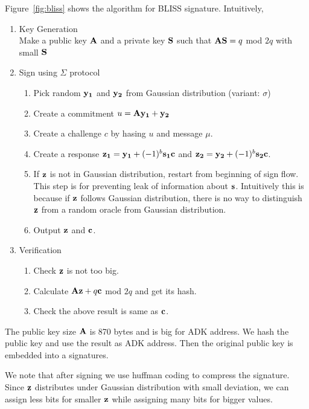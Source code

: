 \documentclass[a4paper,10pt,twocolumn]{article}
\begin{document}
 Figure~\ref{fig:bliss} shows the algorithm for BLISS signature. Intuitively,
 \begin{enumerate}
	\setlength\itemsep{0em}
\item Key Generation \\
Make a public key \( {\bf A} \) and a private key \( {\bf S} \) such that
\( {\bf A}{\bf S}=q \) mod \( 2q \)  with small \( {\bf S} \) 
\item Sign using \( \Sigma \) protocol
\begin{enumerate}
	\setlength\itemsep{0em}
	\item Pick random \( {\bf y_1} \) and \( {\bf y_2} \) from Gaussian distribution (variant: \( \sigma \))
\item Create a commitment  \( u = {\bf A}{\bf y_1} + {\bf y_2} \)
\item Create a challenge \( c \) by hasing \( u \) and message \( \mu \).
\item Create a response  \({\bf z_1} = {\bf y_1} + (-1)^{b}{\bf s_1}{\bf c}\) and  \({\bf z_2}= {\bf y_2} + (-1)^{b}{\bf s_2}{\bf c}\).
\item If \( {\bf z} \) is not in Gaussian distribution, restart from beginning of sign flow. This step is for preventing
leak of information about \( {\bf s} \). Intuitively this is because if \( {\bf z} \) follows Gaussian distribution, there is no way to
distinguish \( {\bf z} \)  from a random oracle from Gaussian distribution.
\item Output \( {\bf z} \) and \( {\bf c} \).
\end{enumerate}
\item Verification
\begin{enumerate}
	\setlength\itemsep{0em}
	\item Check \( {\bf z} \) is not too big.
	\item Calculate \( {\bf A}{\bf z} + q {\bf c} \) mod \(2q\) and get its hash.
	\item Check the above result is same as \( {\bf c} \).
	\end{enumerate}
 \end{enumerate}

The public key size \( {\bf A} \) is  870 bytes and is big for ADK address. We hash the public key and 
use the result as ADK address. Then the original public key is embedded into a signatures.

We note that after signing we use huffman coding to compress the signature. Since \( {\bf z}  \)  
distributes under Gaussian distribution with small deviation, we can assign less bits for smaller  \( {\bf z} \)
while assigning many bits for bigger values.
	
\end{document}
